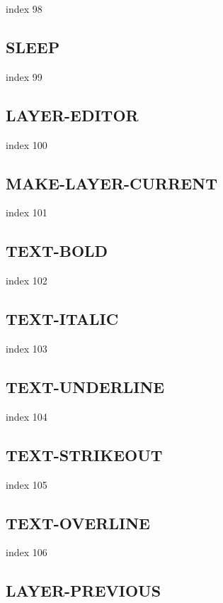 \documentclass[11pt]{report}
\begin{document}
 index 98

\subsection{SLEEP}

index 99

\subsection{LAYER-EDITOR}

index 100

\subsection{MAKE-LAYER-CURRENT}

index 101

\subsection{TEXT-BOLD}

index 102

\subsection{TEXT-ITALIC}

index 103

\subsection{TEXT-UNDERLINE}

index 104

\subsection{TEXT-STRIKEOUT}

index 105

\subsection{TEXT-OVERLINE}

index 106

\subsection{LAYER-PREVIOUS}
\end{document}
